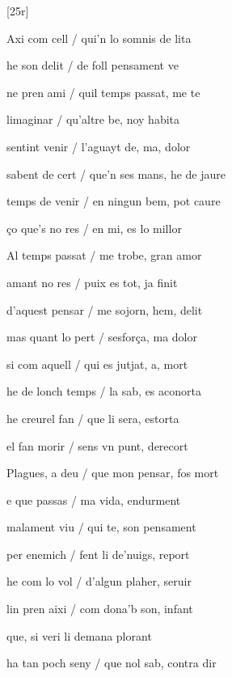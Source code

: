 




[25r]
\begin{estrofa}

 Axi com cell / qui'n lo somnis de lita

 he son delit / de foll pensament ve

 ne pren ami / quil temps passat, me te

 limaginar / qu'altre be, noy habita

 sentint venir / l'aguayt de, ma, dolor

 sabent de cert / que'n ses mans, he de jaure

 temps de venir / en ningun bem, pot caure

 \c{c}o que's no res / en mi, es lo millor

\end{estrofa}



\begin{estrofa}

 Al temps passat / me trobe, gran amor

 amant no res / puix es tot, ja finit

 d'aquest pensar / me sojorn, hem, delit

 mas quant lo pert / sesfor\c{c}a, ma dolor

 si com aquell / qui es jutjat, a, mort

 he de lonch temps / la sab, es aconorta

 he creurel fan / que li sera, estorta

 el fan morir / sens vn punt, derecort

\end{estrofa}



\begin{estrofa}

 Plagues, a deu / que mon pensar, fos mort

 e que passas / ma vida, endurment

 malament viu / qui te, son pensament

 per enemich / fent li de'nuigs, report

 he com lo vol / d'algun plaher, seruir

 lin pren aixi / com dona'b son, infant

 que, si veri li demana plorant

 ha tan poch seny / que nol sab, contra dir

\end{estrofa}



